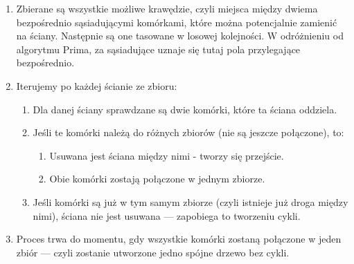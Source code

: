 \documentclass[12pt, a4paper]{article}
\begin{document}
\begin{enumerate}
\item Zbierane są wszystkie możliwe krawędzie, czyli miejsca między dwiema bezpośrednio sąsiadującymi komórkami, które można potencjalnie zamienić na ściany. Następnie są one tasowane w losowej kolejności. W odróżnieniu od algorytmu Prima, za sąsiadujące uznaje się tutaj pola przylegające bezpośrednio.

\item Iterujemy po każdej ścianie ze zbioru:
\begin{enumerate}
    \item Dla danej ściany sprawdzane są dwie komórki, które ta ściana oddziela.
    \item Jeśli te komórki należą do różnych zbiorów (nie są jeszcze połączone), to:
    \begin{enumerate}
      \item Usuwana jest ściana między nimi - tworzy się przejście.
      \item Obie komórki zostają połączone w jednym zbiorze.
    \end{enumerate}
    \item Jeśli komórki są już w tym samym zbiorze (czyli istnieje już droga między nimi), ściana nie jest usuwana — zapobiega to tworzeniu cykli.
\end{enumerate}

\item Proces trwa do momentu, gdy wszystkie komórki zostaną połączone w jeden zbiór — czyli zostanie utworzone jedno spójne drzewo bez cykli.
\end{enumerate}





%     

\end{document}
